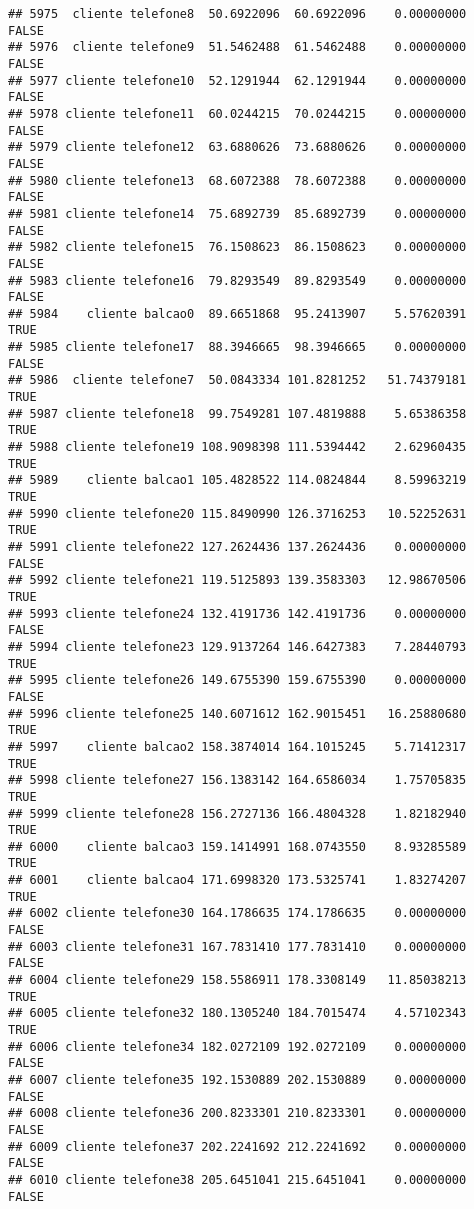 \documentclass[
]{article}
\begin{document}
\begin{verbatim}
## 5975  cliente telefone8  50.6922096  60.6922096    0.00000000    FALSE
## 5976  cliente telefone9  51.5462488  61.5462488    0.00000000    FALSE
## 5977 cliente telefone10  52.1291944  62.1291944    0.00000000    FALSE
## 5978 cliente telefone11  60.0244215  70.0244215    0.00000000    FALSE
## 5979 cliente telefone12  63.6880626  73.6880626    0.00000000    FALSE
## 5980 cliente telefone13  68.6072388  78.6072388    0.00000000    FALSE
## 5981 cliente telefone14  75.6892739  85.6892739    0.00000000    FALSE
## 5982 cliente telefone15  76.1508623  86.1508623    0.00000000    FALSE
## 5983 cliente telefone16  79.8293549  89.8293549    0.00000000    FALSE
## 5984    cliente balcao0  89.6651868  95.2413907    5.57620391     TRUE
## 5985 cliente telefone17  88.3946665  98.3946665    0.00000000    FALSE
## 5986  cliente telefone7  50.0843334 101.8281252   51.74379181     TRUE
## 5987 cliente telefone18  99.7549281 107.4819888    5.65386358     TRUE
## 5988 cliente telefone19 108.9098398 111.5394442    2.62960435     TRUE
## 5989    cliente balcao1 105.4828522 114.0824844    8.59963219     TRUE
## 5990 cliente telefone20 115.8490990 126.3716253   10.52252631     TRUE
## 5991 cliente telefone22 127.2624436 137.2624436    0.00000000    FALSE
## 5992 cliente telefone21 119.5125893 139.3583303   12.98670506     TRUE
## 5993 cliente telefone24 132.4191736 142.4191736    0.00000000    FALSE
## 5994 cliente telefone23 129.9137264 146.6427383    7.28440793     TRUE
## 5995 cliente telefone26 149.6755390 159.6755390    0.00000000    FALSE
## 5996 cliente telefone25 140.6071612 162.9015451   16.25880680     TRUE
## 5997    cliente balcao2 158.3874014 164.1015245    5.71412317     TRUE
## 5998 cliente telefone27 156.1383142 164.6586034    1.75705835     TRUE
## 5999 cliente telefone28 156.2727136 166.4804328    1.82182940     TRUE
## 6000    cliente balcao3 159.1414991 168.0743550    8.93285589     TRUE
## 6001    cliente balcao4 171.6998320 173.5325741    1.83274207     TRUE
## 6002 cliente telefone30 164.1786635 174.1786635    0.00000000    FALSE
## 6003 cliente telefone31 167.7831410 177.7831410    0.00000000    FALSE
## 6004 cliente telefone29 158.5586911 178.3308149   11.85038213     TRUE
## 6005 cliente telefone32 180.1305240 184.7015474    4.57102343     TRUE
## 6006 cliente telefone34 182.0272109 192.0272109    0.00000000    FALSE
## 6007 cliente telefone35 192.1530889 202.1530889    0.00000000    FALSE
## 6008 cliente telefone36 200.8233301 210.8233301    0.00000000    FALSE
## 6009 cliente telefone37 202.2241692 212.2241692    0.00000000    FALSE
## 6010 cliente telefone38 205.6451041 215.6451041    0.00000000    FALSE

\end{verbatim}
\end{document}
